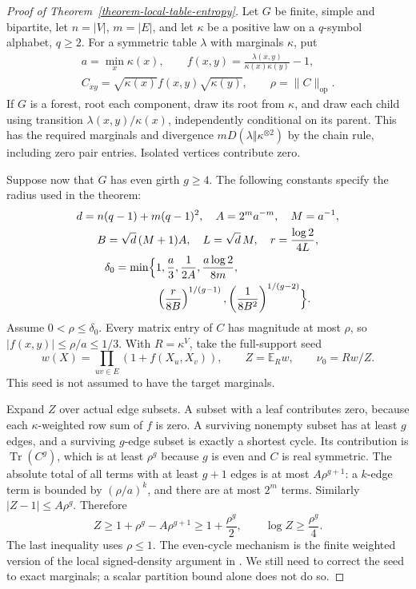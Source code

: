 \documentclass[a4paper,11pt,reqno]{amsart}
\theoremstyle{plain}
\theoremstyle{definition}
\theoremstyle{remark}
\begin{document}
\begin{proof}[Proof of Theorem~\ref{theorem-local-table-entropy}]
Let $G$ be finite, simple and bipartite, let $n=|V|$, $m=|E|$, and let
$\kappa$ be a positive law on a $q$-symbol alphabet, $q\ge2$.
For a symmetric table $\lambda$ with marginals $\kappa$, put
\begin{gather*}
 a=\min_x\kappa(x),\qquad
 f(x,y)=\frac{\lambda(x,y)}{\kappa(x)\kappa(y)}-1,\\
 C_{xy}=\sqrt{\kappa(x)}f(x,y)\sqrt{\kappa(y)},\qquad
 \rho=\|C\|_{\mathrm{op}}.
\end{gather*}
If $G$ is a forest, root each component, draw its root from $\kappa$, and
draw each child using transition $\lambda(x,y)/\kappa(x)$, independently
conditional on its parent.  This has the required marginals and divergence
$mD(\lambda\Vert\kappa^{\otimes2})$ by the chain rule, including zero
pair entries.  Isolated vertices contribute zero.

Suppose now that $G$ has even girth $g\ge4$.  The following constants specify
the radius used in the theorem:
\begin{gather*}
 d=n(q-1)+m(q-1)^2,\quad A=2^ma^{-m},\quad M=a^{-1},
\\ B=\sqrt d\,(M+1)A,\quad L=\sqrt d\,M,\quad r=\frac{\log2}{4L},\\
 \begin{aligned}
 \delta_0=\min\Bigl\{&1,\frac a3,\frac1{2A},\frac{a\log2}{8m},\\
       &\left(\frac r{8B}\right)^{1/(g-1)},
       \left(\frac1{8B^2}\right)^{1/(g-2)}\Bigr\}.
 \end{aligned}
\end{gather*}
Assume $0<\rho\le\delta_0$.  Every matrix entry of $C$ has magnitude at
most $\rho$, so $|f(x,y)|\le\rho/a\le1/3$.
With $R=\kappa^V$, take the full-support seed
\[
 w(X)=\prod_{uv\in E}(1+f(X_u,X_v)),\qquad
 Z=\mathbb E_Rw,\qquad \nu_0=Rw/Z.
\]
This seed is not assumed to have the target marginals.

Expand $Z$ over actual edge subsets.  A subset with a leaf contributes
zero, because each $\kappa$-weighted row sum of $f$ is zero.  A surviving
nonempty subset has at least $g$ edges, and a surviving $g$-edge subset is
exactly a shortest cycle.  Its contribution is $\operatorname{Tr}(C^g)$,
which is at least $\rho^g$ because $g$ is even and $C$ is real symmetric.
The absolute total of all terms with at least $g+1$ edges is at most
$A\rho^{g+1}$: a $k$-edge term is bounded by $(\rho/a)^k$, and there are
at most $2^m$ terms.  Similarly $|Z-1|\le A\rho^g$.  Therefore
\begin{equation}\label{eq-local-partition-gain}
 Z\ge1+\rho^g-A\rho^{g+1}\ge1+\frac{\rho^g}{2},\qquad
 \log Z\ge\frac{\rho^g}{4}.
\end{equation}
The last inequality uses $\rho\le1$.  The even-cycle mechanism is the
finite weighted version of the local signed-density argument in
\citet{lovasz2010}.  We still need to correct the seed to exact marginals;
a scalar partition bound alone does not do so.


\end{proof}
\end{document}
